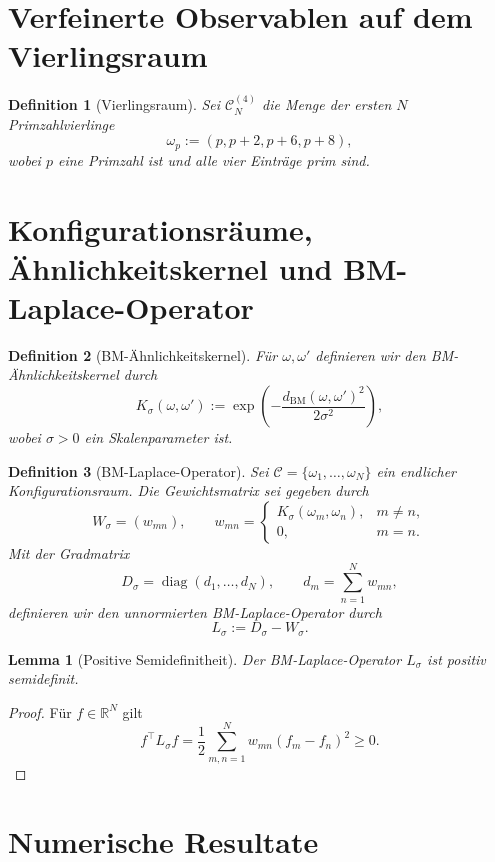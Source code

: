 \documentclass[11pt,a4paper]{article}
\newtheorem{definition}{Definition}
\newtheorem{lemma}{Lemma}
\begin{document}
\section{Verfeinerte Observablen auf dem Vierlingsraum}

\begin{definition}[Vierlingsraum]
Sei $\mathcal C_N^{(4)}$ die Menge der ersten $N$ Primzahlvierlinge
\[
\omega_p:=(p,p+2,p+6,p+8),
\]
wobei $p$ eine Primzahl ist und alle vier Einträge prim sind.
\end{definition}

\section{Konfigurationsräume, Ähnlichkeitskernel und BM-Laplace-Operator}

\begin{definition}[BM-Ähnlichkeitskernel]
Für $\omega,\omega'$ definieren wir den BM-Ähnlichkeitskernel durch
\[
K_\sigma(\omega,\omega')
:=
\exp\!\left(
-\frac{d_{\mathrm{BM}}(\omega,\omega')^2}{2\sigma^2}
\right),
\]
wobei $\sigma>0$ ein Skalenparameter ist.
\end{definition}

\begin{definition}[BM-Laplace-Operator]
Sei $\mathcal C=\{\omega_1,\dots,\omega_N\}$ ein endlicher Konfigurationsraum. Die Gewichtsmatrix sei gegeben durch
\[
W_\sigma=(w_{mn}),
\qquad
w_{mn}=
\begin{cases}
K_\sigma(\omega_m,\omega_n), & m\neq n,\\
0, & m=n.
\end{cases}
\]
Mit der Gradmatrix
\[
D_\sigma=\operatorname{diag}(d_1,\dots,d_N),
\qquad
d_m=\sum_{n=1}^N w_{mn},
\]
definieren wir den unnormierten BM-Laplace-Operator durch
\[
L_\sigma:=D_\sigma-W_\sigma.
\]
\end{definition}

\begin{lemma}[Positive Semidefinitheit]
Der BM-Laplace-Operator $L_\sigma$ ist positiv semidefinit.
\end{lemma}

\begin{proof}
Für $f\in\mathbb R^N$ gilt
\[
f^\top L_\sigma f
=
\frac12
\sum_{m,n=1}^N
w_{mn}(f_m-f_n)^2
\ge 0.
\]
\end{proof}

\section{Numerische Resultate}
\end{document}
